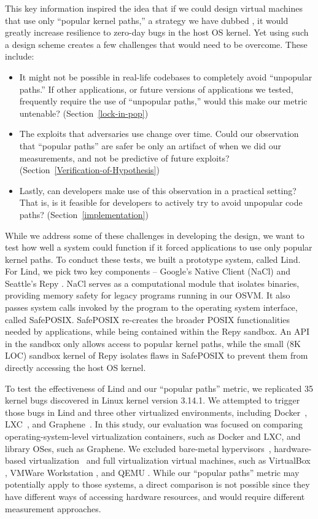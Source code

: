 This key information inspired the idea that if we could design virtual machines
 that use only ``popular kernel paths,'' a strategy we have dubbed \lip,
it would greatly increase resilience to zero-day bugs in the host OS kernel.
Yet using such a design scheme creates a few challenges that would need to be
 overcome. These include:

\begin{itemize}
\item It might not be possible in real-life codebases to completely avoid ``unpopular paths.''
If other applications, or future versions of applications we tested, frequently require the use of ``unpopular paths,'' would this make our metric untenable?
(Section~{\ref{lock-in-pop}})
\item The exploits that adversaries use change over time. Could our observation that ``popular paths'' are safer be only an artifact of when we did our measurements,
and not be predictive of future exploits? (Section~{\ref{Verification-of-Hypothesis}})
\item Lastly, can developers make use of this observation in a practical setting? That is, is it feasible for developers to actively try to avoid unpopular code paths?
(Section~{\ref{implementation}})
\end{itemize}

While we address some of these challenges in developing the \lip design,
we want to test how well a system could function if it forced applications to
use only popular kernel paths.
To conduct these tests, we built a prototype system, called Lind.
For Lind, we pick two key components -- Google's Native Client
(NaCl) \cite{NaCl-09} and Seattle's Repy \cite{Repy-10}.
NaCl serves as a computational module that isolates
binaries, providing memory safety for legacy programs running in our OSVM.
It also passes system calls invoked by the program to the operating system interface, called SafePOSIX.
SafePOSIX re-creates the broader POSIX functionalities needed by applications, while being contained within the Repy sandbox.
An API in the sandbox only allows access to popular kernel paths, while
the small (8K LOC) sandbox kernel of Repy isolates flaws in SafePOSIX
to prevent them from directly accessing the host OS kernel.

To test the effectiveness of Lind and our ``popular paths'' metric,
we replicated 35 kernel bugs discovered in Linux kernel version 3.14.1. We attempted
to trigger those bugs in Lind and three other virtualized environments,
including Docker~\cite{Docker}, LXC~\cite{LXC}, and Graphene~\cite{Graphene-14}.
In this study, our evaluation was focused on comparing operating-system-level virtualization containers, such as Docker and LXC,
and library OSes, such as Graphene.
We excluded bare-metal hypervisors~\cite{Xen-03, VMWare-Server},
hardware-based virtualization~\cite{IntelVT, keller2010nohype} and full virtualization
virtual machines, such as VirtualBox \cite{VirtualBox}, VMWare Workstation \cite{VMWare-Workstation}, and QEMU \cite{QEMU}.
While our ``popular paths'' metric may potentially apply to those
systems, a direct comparison is not possible since they have different
ways of accessing hardware resources, and would require different measurement approaches.

